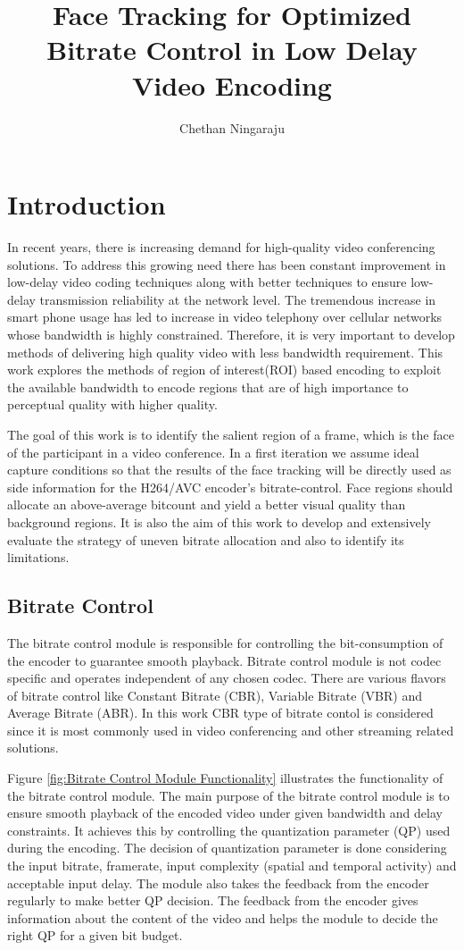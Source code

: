 \documentclass[11pt]{article} %
\title{Face Tracking for Optimized Bitrate Control in Low Delay Video Encoding}
\author{Chethan Ningaraju}
\begin{document}
\maketitle
\clearpage
\tableofcontents
\clearpage
\section{Introduction}
	In recent years, there is increasing demand for high-quality video conferencing solutions. To address this growing need there has been constant improvement in  low-delay video coding techniques along with better techniques to ensure low-delay transmission reliability at the network level. The tremendous increase in smart phone usage has led to increase in video telephony over cellular networks whose bandwidth is highly constrained. Therefore, it is very important to develop methods of delivering high quality video with less bandwidth requirement. This work explores the methods of region of interest(ROI) based encoding to exploit the available bandwidth to encode regions that are of high importance to perceptual quality with higher quality. 

The goal of this work is to identify the salient region of a frame, which is the face of the participant in a video conference. In a first iteration we assume ideal capture conditions so that the results of the face tracking will be directly used as side information for the H264/AVC encoder's bitrate-control. Face regions should allocate an above-average bitcount and yield a better visual quality than background regions. It is also the aim of this work to develop and extensively evaluate the strategy of uneven bitrate allocation and also to identify its limitations.
  \subsection{Bitrate Control}
	The bitrate control module is responsible for controlling the bit-consumption of the encoder to guarantee smooth playback. Bitrate control module is not codec specific and operates independent of any chosen codec. There are various flavors of bitrate control like Constant Bitrate (CBR), Variable Bitrate (VBR) and Average Bitrate (ABR). In this work CBR type of bitrate contol is considered since it is most commonly used in video conferencing and other streaming related solutions. 
	
	Figure \ref{fig:Bitrate Control Module Functionality} illustrates the functionality of the bitrate control module. The main purpose of the bitrate control module is to ensure smooth playback of the encoded video under given bandwidth and delay constraints.  It achieves this by controlling the quantization parameter (QP) used during the encoding. The decision of quantization parameter is done considering the input bitrate, framerate, input complexity (spatial and temporal activity) and acceptable input delay. The module also takes the feedback from the encoder regularly to make better QP decision.  The feedback from the encoder gives information about the content of the video and helps the module to decide the right QP for a given bit budget.
	
\end{document}
